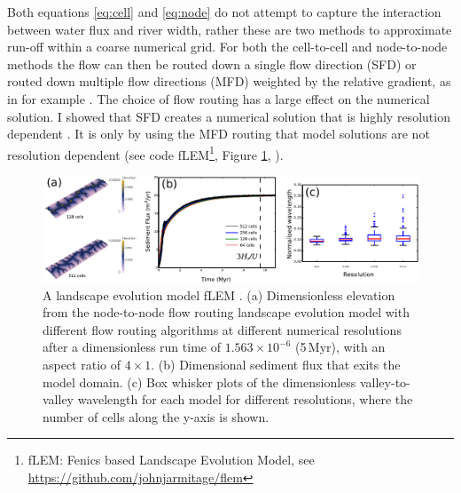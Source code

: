 \begin{subappendices}
Both equations \ref{eq:cell} and \ref{eq:node} do not attempt to capture the interaction between water flux and river width, rather these are two methods to approximate run-off within a coarse numerical grid. For both the cell-to-cell and node-to-node methods the flow can then be routed down a single flow direction (SFD) or routed down multiple flow directions (MFD) weighted by the relative gradient, as in for example \cite{schoorl-etal-2000}. The choice of flow routing has a large effect on the numerical solution. I showed that SFD creates a numerical solution that is highly resolution dependent \citep{armitage-2019}. It is only by using the MFD routing that model solutions are not resolution dependent (see code fLEM\footnote{fLEM: Fenics based Landscape Evolution Model, see \url{https://github.com/johnjarmitage/flem}}, Figure \ref{fg:MFD}, \citealp{armitage-2019}).

\begin{figure}
\centering
\includegraphics[width=\textwidth]{./figures/ch2-MFD.pdf}
\caption{A landscape evolution model fLEM \citep{armitage-2019}. (a) Dimensionless elevation from the node-to-node flow routing landscape evolution model with different flow routing algorithms at different numerical resolutions after a dimensionless run time of $1.563\times10^{-6}$ (5\,Myr), with an aspect ratio of $4\times1$. (b) Dimensional sediment flux that exits the model domain. (c) Box whisker plots of the dimensionless valley-to-valley wavelength for each model for different resolutions, where the number of cells along the y-axis is shown.}
\label{fg:MFD}
\end{figure}


\end{subappendices}
